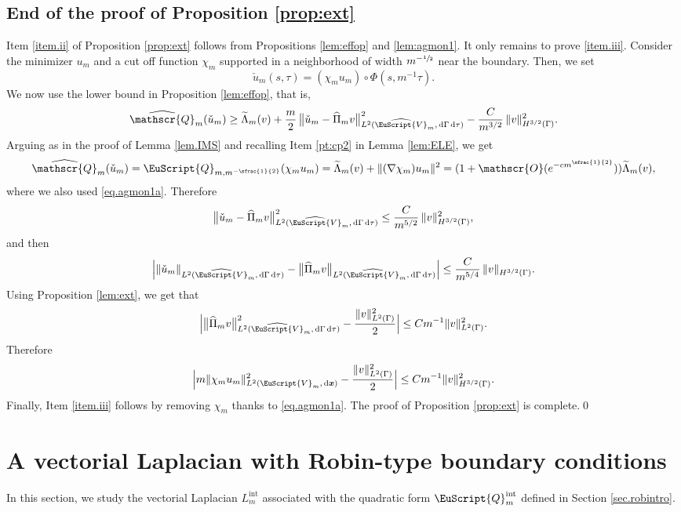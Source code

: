 \documentclass[10pt]{amsart}
\let\mathcal \EuScript
\newcommand{\scrO}{\mathscr{O}}
\newcommand{\scrQ}{\mathscr{Q}}
\newcommand{\cQ}{\mathcal{Q}}
\newcommand{\cV}{\mathcal{V}}
\newcommand{\intt}{\mathrm{int}}
\theoremstyle{plain}
\theoremstyle{definition}
\newcommand{\dx}{\mathrm{\,d}}
\newcommand{\bx}{{\boldsymbol x}}
\begin{document}
\subsection{End of the proof of Proposition \ref{prop:ext}}
Item \eqref{item.ii} of Proposition \ref{prop:ext} follows from Propositions \ref{lem:effop} and \ref{lem:agmon1}. It only remains to prove \eqref{item.iii}. Consider the minimizer $u_{m}$ and a cut off function $\chi_{m}$ supported in a neighborhood of width $m^{-\sfrac{1}{2}}$ near the boundary. Then, we set
\[\check u_{m}(s,\tau)= (\chi_{m} u_{m})\circ \Phi(s,m^{-1}\tau).\]
We now use the lower bound in Proposition \ref{lem:effop}, that is,
\[
\widehat{\scrQ}_m(\check u_{m})\geq \widetilde \Lambda_{m}(v)
+\frac{m}{2}\,
\bigl\|\check u_{m}-\widehat{\Pi}_m v\bigr\|^2_{L^2(\widehat{\cV}_m, \dx\Gamma\dx\tau)}-\frac{C}{m^{3/2}}\, \|v\|_{H^{3/2}(\Gamma)} ^2.
\]
Arguing as in the proof of Lemma \ref{lem.IMS} and recalling Item \eqref{pt:cp2} in Lemma \ref{lem:ELE}, we get
\[\widehat{\scrQ}_m(\check u_{m})=\cQ_{m, m^{-\sfrac{1}{2}}}(\chi_{m} u_{m})=\widetilde \Lambda_{m}(v)+\|(\nabla \chi_{m}) u_{m}\|^2=(1+\scrO(e^{-cm^{\sfrac{1}{2}}}))\widetilde \Lambda_{m}(v),\]
where we also used \eqref{eq.agmon1a}.
Therefore
\[\bigl\|\check u_{m}-\widehat{\Pi}_m v\bigr\|^2_{L^2(\widehat{\cV}_m, \dx\Gamma\dx\tau)}\leq \frac{C}{m^{5/2}}\, \|v\|_{H^{3/2}(\Gamma)} ^2,\]
and then
\[\left|\|\check u_{m}\|_{L^2(\widehat{\cV}_m, \dx\Gamma\dx\tau)}-\bigl\|\widehat{\Pi}_m v\bigr\|_{L^2(\widehat{\cV}_m, \dx\Gamma\dx\tau)}\right|\leq \frac{C}{m^{5/4}}\, \|v\|_{H^{3/2}(\Gamma)}.\]
Using Proposition \ref{lem:ext}, we get that
\[\Bigl|\bigl\|\widehat{\Pi}_m v\bigr\|^2_{L^2(\widehat{\cV}_m, \dx\Gamma\dx\tau)}-\frac{\|v\|^2_{L^2(\Gamma)}}{2}\Bigr|\leq Cm^{-1}\|v\|^2_{L^2(\Gamma)}.\]
Therefore
\[\Bigl |m\|\chi_{m} u_{m}\|^2_{L^2(\cV_m, \dx\bx)}-\frac{\|v\|^2_{L^2(\Gamma)}}{2} \Bigr|\leq Cm^{-1} \|v\|^2_{H^{3/2}(\Gamma)}.\]
Finally, Item \eqref{item.iii} follows by removing $\chi_{m}$ thanks to \eqref{eq.agmon1a}. The proof of Proposition \ref{prop:ext} is complete.\qed

\section{A vectorial Laplacian with Robin-type boundary conditions}\label{sec.3}
In this section, we study the vectorial Laplacian $L_m^\intt$ associated with the quadratic form $\cQ_m^\intt$ defined in Section \ref{sec.robintro}.
\end{document}
